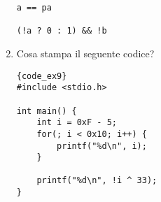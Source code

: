 \begin{enumerate}
\begin{minipage}{.45\textwidth}
\begin{verbatim}
a == pa

(!a ? 0 : 1) && !b
\end{verbatim} 
        
\end{minipage}\hfill
\vspace{.5cm}
\begin{minipage}[t]{.45\textwidth}
\end{minipage}


\vspace{0.7cm}
\item {} Cosa stampa il seguente codice?

\begin{minipage}{.40\textwidth}
\begin{lstlisting}{code_ex9}
#include <stdio.h>

int main() {
    int i = 0xF - 5;
    for(; i < 0x10; i++) {
        printf("%d\n", i);
    }

    printf("%d\n", !i ^ 33);
}
\end{lstlisting}
\end{minipage}\hfill
\begin{minipage}[t]{.50\textwidth}
\end{minipage}



\end{enumerate}
